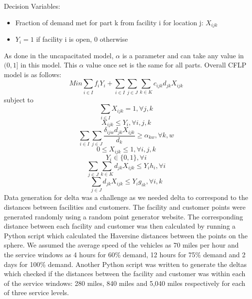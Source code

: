 \documentclass[12pt]{article}
\numberwithin{equation}{section}
\begin{document}
Decision Variables:
\begin{itemize}
\item
Fraction of demand met for part k from facility i for location j: $X_{ijk}$
\item
$Y_i = 1$ if facility i is open, 0 otherwise
\end{itemize}
As done in the uncapacitated model, $\alpha$ is a parameter and can take any value in $(0,1]$ in this model. This $\alpha$ value once set is the same for all parts. Overall CFLP model is as follows:
\begin{equation}
\label{obj}
Min \sum_{i\in I}f_{i}Y_{i} + \sum_{i\in I}\sum_{j\in J}\sum_{k\in K}c_{ijk}d_{jk}X_{ijk}  
\end{equation}
\hspace{2cm} subject to
\begin{equation}
\label{demand}
\sum_{i\in I}X_{ijk} = 1,  \forall j,k  
\end{equation}
\begin{equation}
\label{supply}
X_{ijk} \leq Y_{i},  \forall i,j,k  
\end{equation}
\begin{equation}
\label{compound}
\sum_{i\in I}\sum_{j\in J}\frac{\delta_{ijw}d_{jk}X_{ijk}}{d_k} \geq \alpha_{kw},  \forall k,w  
\end{equation}
\begin{equation}
\label{Fraction}
0 \leq X_{ijk} \leq 1,  \forall i,j,k  
\end{equation}
\begin{equation}
\label{Indicator}
Y_{i} \in \{0,1\}, \forall i 
\end{equation}
\begin{equation}
\label{FacCapacity}
\sum_{j\in J}\sum_{k\in K} d_{jk}X_{ijk} \leq Y_{i}h_{i},    \forall i
\end{equation}
\begin{equation}
\label{PartCapacity}
\sum_{j\in J} d_{jk}X_{ijk} \leq Y_{i}g_{ik},    \forall i,k
\end{equation}
Data generation for delta was a challenge as we needed delta to correspond to the distances between facilities and customers. The facility and customer points were generated randomly using a random point generator website\cite{random}. The corresponding distance between each facility and customer was then calculated by running a Python script which calculated the Haversine distances between the points on the sphere. We assumed the average speed of the vehicles as 70 miles per hour and the service windows as 4 hours for 60\% demand, 12 hours for 75\% demand and 2 days for 100\% demand. Another Python script was written to generate the deltas which checked if the distances between the facility and customer was within each of the service windows: 280 miles, 840 miles and 5,040 miles respectively for each of three service levels.\\
\end{document}
